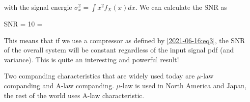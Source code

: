 with the signal energie $\sigma_x^2 = \int x^2 f_X(x) dx$. We can calculate the SNR as

\bee
SNR = 10 \log {} = 
\eee

This means that if we use a compressor as defined by \eqref{2021-06-16:eq3}, the SNR of the overall system will be constant regardless of the input signal pdf (and variance). This is quite an interesting and powerful result!

Two companding characteristics that are widely used today are $\mu$-law companding and A-law companding. $\mu$-law is used in North America and Japan, the rest of the world uses A-law characteristic.



